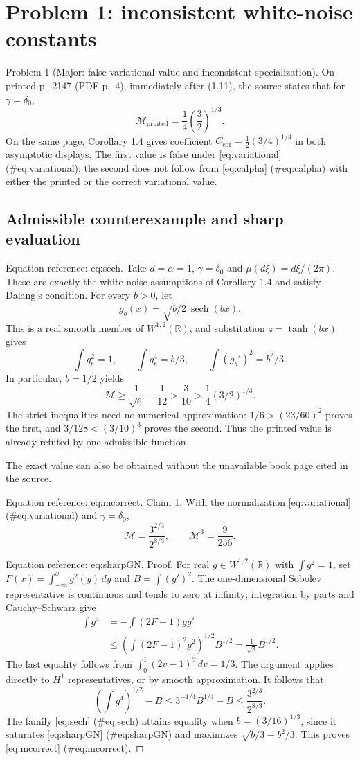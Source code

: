 \documentclass[10pt]{article}
\begin{document}
\section*{Problem 1: inconsistent white-noise constants}
Problem 1 (Major: false variational value and inconsistent specialization).  On printed p. 2147 (PDF p. 4), immediately after (1.11), the source states that for \(\gamma=\delta_0\), \[\mathcal M_{\mathrm{printed}}=\frac14\left(\frac32\right)^{1/3}.\] On the same page, Corollary 1.4 gives coefficient \(C_{\mathrm{cor}}=\frac12(3/4)^{1/4}\) in both asymptotic displays. The first value is false under [eq:variational] (\#eq:variational); the second does not follow from [eq:calpha] (\#eq:calpha) with either the printed or the correct variational value.\par
\subsection*{Admissible counterexample and sharp evaluation}
Equation reference: eq:sech. Take \(d=\alpha=1\), \(\gamma=\delta_0\) and \(\mu(d\xi)=d\xi/(2\pi)\). These are exactly the white-noise assumptions of Corollary 1.4 and satisfy Dalang’s condition. For every \(b>0\), let \[g_b(x)=\sqrt{b/2}\,\operatorname{sech}(bx).\] This is a real smooth member of \(W^{1,2}(\mathbb R)\), and substitution \(z=\tanh(bx)\) gives \[
 \int g_b^2=1,\qquad \int g_b^4=b/3,\qquad
 \int(g_b')^2=b^2/3.\] In particular, \(b=1/2\) yields \[\mathcal M\ge\frac1{\sqrt6}-\frac1{12}>\frac3{10}>
        \frac14(3/2)^{1/3}.\] The strict inequalities need no numerical approximation: \(1/6>(23/60)^2\) proves the first, and \(3/128<(3/10)^3\) proves the second. Thus the printed value is already refuted by one admissible function.\par
The exact value can also be obtained without the unavailable book page cited in the source.\par
Equation reference: eq:mcorrect. Claim 1.  With the normalization [eq:variational] (\#eq:variational) and \(\gamma=\delta_0\), \[
 \mathcal M=\frac{3^{2/3}}{2^{8/3}},\qquad \mathcal M^3=\frac9{256}.\]\par
Equation reference: eq:sharpGN. Proof. For real \(g\in W^{1,2}(\mathbb R)\) with \(\int g^2=1\), set \(F(x)=\int_{-\infty}^xg^2(y)\,dy\) and \(B=\int(g')^2\). The one-dimensional Sobolev representative is continuous and tends to zero at infinity; integration by parts and Cauchy–Schwarz give \[\begin{aligned}
 \int g^4
 &=-\int(2F-1)gg'\nonumber\\
 &\le
   \left(\int(2F-1)^2g^2\right)^{1/2} B^{1/2}
   =\frac1{\sqrt3}B^{1/2}. \end{aligned}\] The last equality follows from \(\int_0^1(2v-1)^2\,dv=1/3\). The argument applies directly to \(H^1\) representatives, or by smooth approximation. It follows that \[\left(\int g^4\right)^{1/2}-B
 \le 3^{-1/4}B^{1/4}-B
 \le \frac{3^{2/3}}{2^{8/3}}.\] The family [eq:sech] (\#eq:sech) attains equality when \(b=(3/16)^{1/3}\), since it saturates [eq:sharpGN] (\#eq:sharpGN) and maximizes \(\sqrt{b/3}-b^2/3\). This proves [eq:mcorrect] (\#eq:mcorrect). ◻\par
\end{document}
